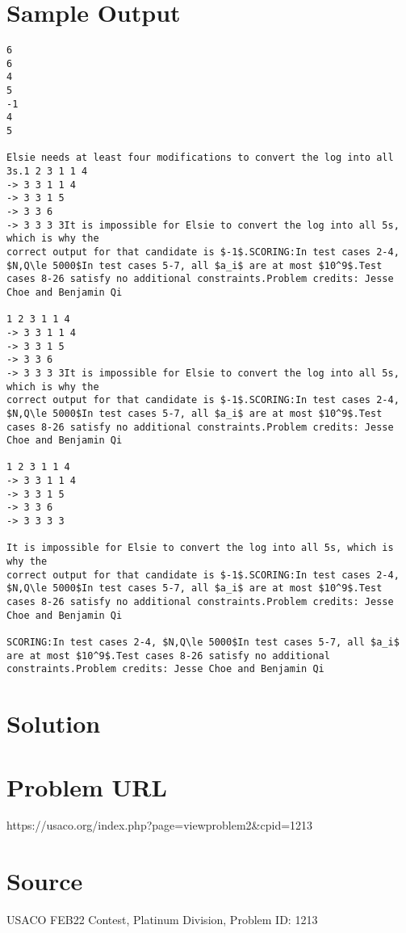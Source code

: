 \documentclass[12pt]{article}
\begin{document}
\section*{Sample Output}
\begin{verbatim}
6
6
4
5
-1
4
5

Elsie needs at least four modifications to convert the log into all 3s.1 2 3 1 1 4
-> 3 3 1 1 4
-> 3 3 1 5
-> 3 3 6
-> 3 3 3 3It is impossible for Elsie to convert the log into all 5s, which is why the 
correct output for that candidate is $-1$.SCORING:In test cases 2-4, $N,Q\le 5000$In test cases 5-7, all $a_i$ are at most $10^9$.Test cases 8-26 satisfy no additional constraints.Problem credits: Jesse Choe and Benjamin Qi

1 2 3 1 1 4
-> 3 3 1 1 4
-> 3 3 1 5
-> 3 3 6
-> 3 3 3 3It is impossible for Elsie to convert the log into all 5s, which is why the 
correct output for that candidate is $-1$.SCORING:In test cases 2-4, $N,Q\le 5000$In test cases 5-7, all $a_i$ are at most $10^9$.Test cases 8-26 satisfy no additional constraints.Problem credits: Jesse Choe and Benjamin Qi

1 2 3 1 1 4
-> 3 3 1 1 4
-> 3 3 1 5
-> 3 3 6
-> 3 3 3 3

It is impossible for Elsie to convert the log into all 5s, which is why the 
correct output for that candidate is $-1$.SCORING:In test cases 2-4, $N,Q\le 5000$In test cases 5-7, all $a_i$ are at most $10^9$.Test cases 8-26 satisfy no additional constraints.Problem credits: Jesse Choe and Benjamin Qi

SCORING:In test cases 2-4, $N,Q\le 5000$In test cases 5-7, all $a_i$ are at most $10^9$.Test cases 8-26 satisfy no additional constraints.Problem credits: Jesse Choe and Benjamin Qi
\end{verbatim}

\section*{Solution}


\section*{Problem URL}
https://usaco.org/index.php?page=viewproblem2&cpid=1213

\section*{Source}
USACO FEB22 Contest, Platinum Division, Problem ID: 1213
\end{document}
